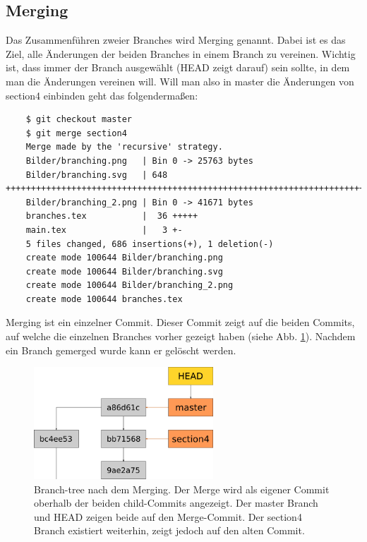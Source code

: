 \subsection{Merging}
Das Zusammenführen zweier Branches wird Merging genannt. Dabei ist es das Ziel, alle Änderungen der beiden Branches in einem Branch zu vereinen. Wichtig ist, dass immer der Branch ausgewählt (HEAD zeigt darauf) sein sollte, in dem man die Änderungen vereinen will. Will man also in master die Änderungen von section4 einbinden geht das folgendermaßen:
\begin{lstlisting}
	$ git checkout master
	$ git merge section4
	Merge made by the 'recursive' strategy.
	Bilder/branching.png   | Bin 0 -> 25763 bytes
	Bilder/branching.svg   | 648 ++++++++++++++++++++++++++++++++++++++++++++++++++++++++++++++++++++++++++
	Bilder/branching_2.png | Bin 0 -> 41671 bytes
	branches.tex           |  36 +++++
	main.tex               |   3 +-
	5 files changed, 686 insertions(+), 1 deletion(-)
	create mode 100644 Bilder/branching.png
	create mode 100644 Bilder/branching.svg
	create mode 100644 Bilder/branching_2.png
	create mode 100644 branches.tex
\end{lstlisting}
Merging ist ein einzelner Commit. Dieser Commit zeigt auf die beiden Commits, auf welche die einzelnen Branches vorher gezeigt haben (siehe Abb. \ref{fig:merge}). Nachdem ein Branch gemerged wurde kann er gelöscht werden.
\begin{figure}[!ht]
	\centering
	\includegraphics[width=0.6\textwidth]{Bilder/branching_3.png}
	\caption{Branch-tree nach dem Merging. Der Merge wird als eigener Commit oberhalb der beiden child-Commits angezeigt. Der master Branch und HEAD zeigen beide auf den Merge-Commit. Der section4 Branch existiert weiterhin, zeigt jedoch auf den alten Commit.}
	\label{fig:merge}
\end{figure}

